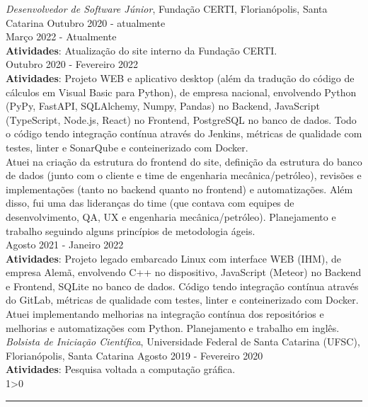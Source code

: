 \documentclass[a4paper,10pt]{article}
\newcommand{\criaSecao}[4][0]{
	\begin{tcolorbox}[
        blanker,
        breakable,
        title=\begin{minipage}{0.16\linewidth}\large{\textbf{#2}}\vspace{-#3\baselineskip}\end{minipage},
        coltitle=black,
        leftupper=0.21\linewidth,
    ]
        #4
		\ifnum0#1>0 { \hrule {\ } } \fi
    \end{tcolorbox}
}
\begin{document}
    \criaSecao[1]{Experiência}{2}{
        \textit{Desenvolvedor de Software Júnior}, Fundação CERTI, Florianópolis, Santa Catarina \hfill Outubro 2020 - atualmente \\
        Março 2022 - Atualmente\\
        \textbf{Atividades}: Atualização do site interno da Fundação CERTI.\\

        Outubro 2020 - Fevereiro 2022\\
        \textbf{Atividades}: Projeto WEB e aplicativo desktop (além da tradução do código de cálculos em Visual Basic para Python), de empresa nacional, envolvendo Python (PyPy, FastAPI, SQLAlchemy, Numpy, Pandas) no Backend, JavaScript (TypeScript, Node.js, React) no Frontend, PostgreSQL no banco de dados. Todo o código tendo integração contínua através do Jenkins, métricas de qualidade com testes, linter e SonarQube e conteinerizado com Docker.\\

        Atuei na criação da estrutura do frontend do site, definição da estrutura do banco de dados (junto com o cliente e time de engenharia mecânica/petróleo), revisões e implementações (tanto no backend quanto no frontend) e automatizações. Além disso, fui uma das lideranças do time (que contava com equipes de desenvolvimento, QA, UX e engenharia mecânica/petróleo). Planejamento e trabalho seguindo alguns princípios de metodologia ágeis.\\

        Agosto 2021 - Janeiro 2022\\
        \textbf{Atividades}: Projeto legado embarcado Linux com interface WEB (IHM), de empresa Alemã, envolvendo C++ no dispositivo, JavaScript (Meteor) no Backend e Frontend, SQLite no banco de dados. Código tendo integração contínua através do GitLab, métricas de qualidade com testes, linter e conteinerizado com Docker.\\

        Atuei implementando melhorias na integração contínua dos repositórios e melhorias e automatizações com Python. Planejamento e trabalho em inglês.\\

        \textit{Bolsista de Iniciação Científica}, Universidade Federal de Santa Catarina (UFSC), Florianópolis, Santa Catarina \hfill Agosto 2019 - Fevereiro 2020 \\
		\textbf{Atividades}: Pesquisa voltada a computação gráfica.\\

}
\end{document}
